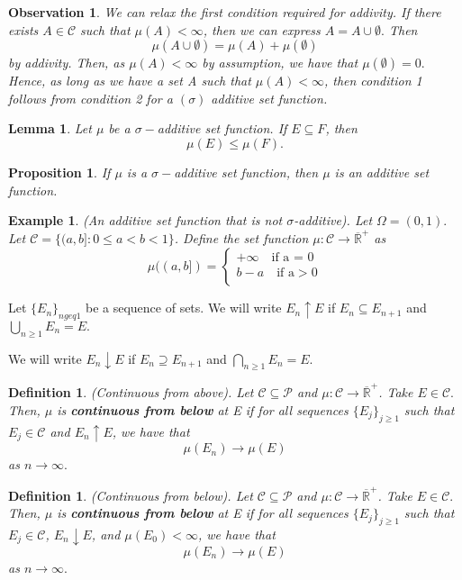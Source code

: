 \documentclass[twoside]{article}
\newtheorem{lemma}[theorem]{Lemma}
\newtheorem{proposition}[theorem]{Proposition}
\newtheorem{definition}[theorem]{Definition}
\newtheorem{observation}[theorem]{Observation}
\newtheorem{example}[theorem]{Example}
\newcommand{\powerset}{\mathcal{P}}
\newcommand{\positiveextendedreal}{\overline{\mathbb{R}}^+}
\begin{document}
\begin{observation}We can relax the first condition required for addivity. If there exists $A \in \mathcal{C}$ such that $\mu(A) < \infty$, then we can express $A = A \cup \emptyset.$ Then 
$$
\mu(A \cup \emptyset) = \mu(A) + \mu(\emptyset)
$$
by addivity. Then, as $\mu(A) < \infty$ by assumption, we have that $\mu(\emptyset) = 0.$ Hence, as long as we have a set A such that $\mu(A) < \infty$, then condition 1 follows from condition 2 for a $(\sigma)$ additive set function.
\end{observation}

\begin{lemma}Let $\mu$ be a $\sigma-$additive set function. If $E \subseteq F$, then 
$$
\mu(E) \leq \mu(F).
$$
\end{lemma}

\begin{proposition}If $\mu$ is a $\sigma-$additive set function, then $\mu$ is an additive set function.
\end{proposition}

\begin{example}(An additive set function that is not $\sigma$-additive). Let $\Omega = (0,1).$ Let $\mathcal{C} = \{(a,b]: 0 \leq a < b < 1\}$. Define the set function $\mu: \mathcal{C} \rightarrow \positiveextendedreal$ as 
$$
\mu((a,b]) = \begin{cases}
+\infty \quad \text{if a = 0}\\
b - a \quad \text{if a}>0\\
\end{cases}
$$
\end{example}

Let $\{E_n\}_{n geq 1}$ be a sequence of sets. We will write $E_n \uparrow E$ if $E_n \subseteq E_{n+1}$ and $\bigcup_{n \geq 1}E_n = E.$ 

We will write $E_n \downarrow E$ if $E_n \supseteq E_{n+1}$ and $\bigcap_{n \geq 1}E_n = E.$ 

\begin{definition}(Continuous from above). Let $\mathcal{C} \subseteq \powerset$ and $\mu: \mathcal{C} \rightarrow \positiveextendedreal$. Take $E \in \mathcal{C}.$ Then, $\mu$ is \textbf{continuous from below} at E if for all sequences $\{E_j\}_{j \geq 1}$ such that $E_j \in \mathcal{C}$ and $E_n \uparrow E$, we have that 
$$
\mu(E_n) \rightarrow \mu(E)
$$
as $n \rightarrow \infty.$
\end{definition}

\begin{definition}(Continuous from below). Let $\mathcal{C} \subseteq \powerset$ and $\mu: \mathcal{C} \rightarrow \positiveextendedreal$. Take $E \in \mathcal{C}.$ Then, $\mu$ is \textbf{continuous from below} at E if for all sequences $\{E_j\}_{j \geq 1}$ such that $E_j \in \mathcal{C}$, $E_n \downarrow E$, and $\mu(E_0) < \infty$, we have that 
$$
\mu(E_n) \rightarrow \mu(E)
$$
as $n \rightarrow \infty.$
\end{definition}
\end{document}
